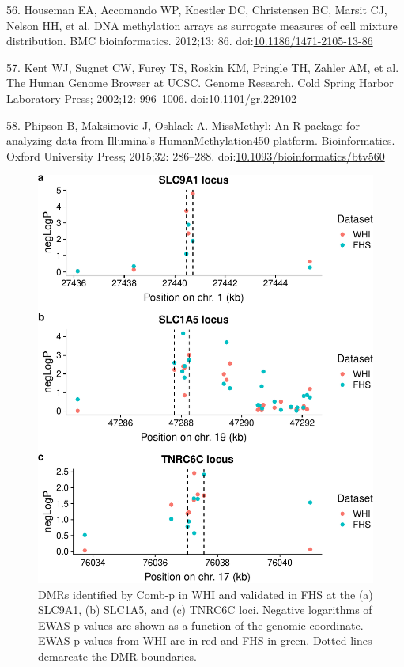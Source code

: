 \documentclass[]{article}
\theoremstyle{definition}
\theoremstyle{definition}
\theoremstyle{definition}
\theoremstyle{remark}
\begin{document}
56. Houseman EA, Accomando WP, Koestler DC, Christensen BC, Marsit CJ,
Nelson HH, et al. DNA methylation arrays as surrogate measures of cell
mixture distribution. BMC bioinformatics. 2012;13: 86.
doi:\href{http://dx.doi.org/10.1186/1471-2105-13-86}{10.1186/1471-2105-13-86}

57. Kent WJ, Sugnet CW, Furey TS, Roskin KM, Pringle TH, Zahler AM, et
al. The Human Genome Browser at UCSC. Genome Research. Cold Spring
Harbor Laboratory Press; 2002;12: 996--1006.
doi:\href{http://dx.doi.org/10.1101/gr.229102}{10.1101/gr.229102}

58. Phipson B, Maksimovic J, Oshlack A. MissMethyl: An R package for
analyzing data from Illumina's HumanMethylation450 platform.
Bioinformatics. Oxford University Press; 2015;32: 286--288.
doi:\href{http://dx.doi.org/10.1093/bioinformatics/btv560}{10.1093/bioinformatics/btv560}

\begin{figure}[htbp]
\centering
\includegraphics{../doc/module_ewas/figures/print-combp-plots-1.pdf}
\caption{\label{fig:print-combp-plots}DMRs identified by Comb-p in WHI and
validated in FHS at the (a) SLC9A1, (b) SLC1A5, and (c) TNRC6C loci.
Negative logarithms of EWAS p-values are shown as a function of the
genomic coordinate. EWAS p-values from WHI are in red and FHS in green.
Dotted lines demarcate the DMR boundaries.}
\end{figure}
\end{document}
